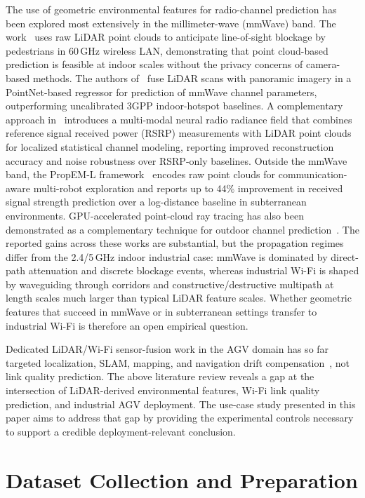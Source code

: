 \documentclass[conference]{IEEEtran}
\begin{document}
The use of geometric environmental features for radio-channel prediction has been explored most extensively in the millimeter-wave (mmWave) band. The work~\cite{ohta2023pointcloud} uses raw LiDAR point clouds to anticipate line-of-sight blockage by pedestrians in 60\,GHz wireless LAN, demonstrating that point cloud-based prediction is feasible at indoor scales without the privacy concerns of camera-based methods. The authors of~\cite{nist2024mmwave} fuse LiDAR scans with panoramic imagery in a PointNet-based regressor for prediction of mmWave channel parameters, outperforming uncalibrated 3GPP indoor-hotspot baselines.
A complementary approach in~\cite{zhang2025mmlscm} introduces a multi-modal neural radio radiance field that combines reference signal received power (RSRP) measurements with LiDAR point clouds for localized statistical channel modeling, reporting improved reconstruction accuracy and noise robustness over RSRP-only baselines. Outside the mmWave band, the PropEM-L framework~\cite{clark2022propeml} encodes raw point clouds for communication-aware multi-robot exploration and reports up to 44\% improvement in received signal strength prediction over a log-distance baseline in subterranean environments. GPU-accelerated point-cloud ray tracing has also been demonstrated as a complementary technique for outdoor channel prediction~\cite{pang2021gpuraytrace}. The reported gains across these works are substantial, but the propagation regimes differ from the 2.4/5\,GHz indoor industrial case: mmWave is dominated by direct-path attenuation and discrete blockage events, whereas industrial Wi\nobreakdash-Fi is shaped by waveguiding through corridors and constructive/destructive multipath at length scales much larger than typical LiDAR feature scales. Whether geometric features that succeed in mmWave or in subterranean settings transfer to industrial Wi\nobreakdash-Fi is therefore an open empirical question.

Dedicated LiDAR/Wi\nobreakdash-Fi sensor-fusion work in the AGV domain has so far targeted localization, SLAM, mapping, and navigation drift compensation~\cite{li2025lidaragv,nguyen2022wifilidar}, not link quality prediction. The above literature review reveals a gap at the intersection of LiDAR-derived environmental features, Wi\nobreakdash-Fi link quality prediction, and industrial AGV deployment. The use-case study presented in this paper aims to address that gap by providing the experimental controls necessary to support a credible deployment-relevant conclusion.


\section{Dataset Collection and Preparation}
\label{sec:data}
\end{document}
